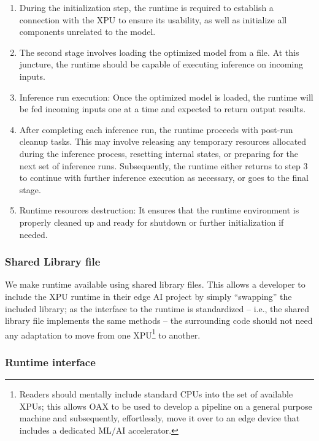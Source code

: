 \documentclass{article}
\begin{document}
\begin{enumerate}
\item During the initialization step, the runtime is required to establish a connection with the XPU to ensure its usability, as well as initialize all components unrelated to the model.
\item The second stage involves loading the optimized model from a file. At this juncture, the runtime should be capable of executing inference on incoming inputs.
\item Inference run execution: Once the optimized model is loaded, the runtime will be fed incoming inputs one at a time and expected to return output results.
\item After completing each inference run, the runtime proceeds with post-run cleanup tasks. This may involve releasing any temporary resources allocated during the inference process, resetting internal states, or preparing for the next set of inference runs. Subsequently, the runtime either returns to step 3 to continue with further inference execution as necessary, or goes to the final stage.
\item Runtime resources destruction: It ensures that the runtime environment is properly cleaned up and ready for shutdown or further initialization if needed.
\end{enumerate}

\subsubsection{Shared Library file}

We make runtime available using shared library files. This allows a developer to include the XPU runtime in their edge AI project by simply ``swapping'' the included library; as the interface to the runtime is standardized -- i.e., the shared library file implements the same methods -- the surrounding code should not need any adaptation to move from one XPU\footnote{Readers should mentally include standard CPUs into the set of available XPUs; this allows OAX to be used to develop a pipeline on a general purpose machine and subsequently, effortlessly, move it over to an edge device that includes a dedicated ML/AI accelerator.} to another.

\subsubsection{Runtime interface}
\end{document}
